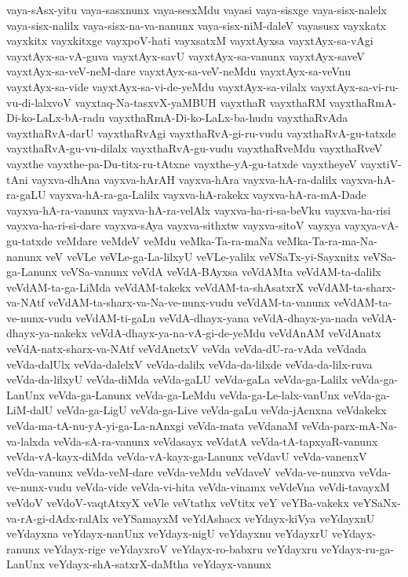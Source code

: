 {vaya-sAsx-yitu
vaya-sasxnunx
vaya-sesxMdu
vayasi
vaya-sisxge
vaya-sisx-nalelx
vaya-sisx-nalilx
vaya-sisx-na-va-nanunx
vaya-sisx-niM-daleV
vayasusx
vayxkatx
vayxkitx
vayxkitxge
vayxpoV-hati
vayxsatxM
vayxtAyxsa
vayxtAyx-sa-vAgi
vayxtAyx-sa-vA-guva
vayxtAyx-savU
vayxtAyx-sa-vanunx
vayxtAyx-saveV
vayxtAyx-sa-veV-neM-dare
vayxtAyx-sa-veV-neMdu
vayxtAyx-sa-veVnu
vayxtAyx-sa-vide
vayxtAyx-sa-vi-de-yeMdu
vayxtAyx-sa-vilalx
vayxtAyx-sa-vi-ru-vu-di-lalxvoV
vayxtaq-Na-tasxvX-yaMBUH
vayxthaR
vayxthaRM
vayxthaRmA-Di-ko-LaLx-bA-radu
vayxthaRmA-Di-ko-LaLx-ba-hudu
vayxthaRvAda
vayxthaRvA-darU
vayxthaRvAgi
vayxthaRvA-gi-ru-vudu
vayxthaRvA-gu-tatxde
vayxthaRvA-gu-vu-dilalx
vayxthaRvA-gu-vudu
vayxthaRveMdu
vayxthaRveV
vayxthe
vayxthe-pa-Du-titx-ru-tAtxne
vayxthe-yA-gu-tatxde
vayxtheyeV
vayxtiV-tAni
vayxva-dhAna
vayxva-hArAH
vayxva-hAra
vayxva-hA-ra-dalilx
vayxva-hA-ra-gaLU
vayxva-hA-ra-ga-Lalilx
vayxva-hA-rakekx
vayxva-hA-ra-mA-Dade
vayxva-hA-ra-vanunx
vayxva-hA-ra-velAlx
vayxva-ha-ri-sa-beVku
vayxva-ha-risi
vayxva-ha-ri-si-dare
vayxva-sAya
vayxva-sithxtw
vayxva-sitoV
vayxya
vayxya-vA-gu-tatxde
veMdare
veMdeV
veMdu
veMka-Ta-ra-maNa
veMka-Ta-ra-ma-Na-nanunx
veV
veVLe
veVLe-ga-La-lilxyU
veVLe-yalilx
veVSaTx-yi-Sayxnitx
veVSa-ga-Lanunx
veVSa-vanunx
veVdA
veVdA-BAyxsa
veVdAMta
veVdAM-ta-dalilx
veVdAM-ta-ga-LiMda
veVdAM-takekx
veVdAM-ta-shAsatxrX
veVdAM-ta-sharx-va-NAtf
veVdAM-ta-sharx-va-Na-ve-nunx-vudu
veVdAM-ta-vanunx
veVdAM-ta-ve-nunx-vudu
veVdAM-ti-gaLu
veVdA-dhayx-yana
veVdA-dhayx-ya-nada
veVdA-dhayx-ya-nakekx
veVdA-dhayx-ya-na-vA-gi-de-yeMdu
veVdAnAM
veVdAnatx
veVdA-natx-sharx-va-NAtf
veVdAnetxV
veVda
veVda-dU-ra-vAda
veVdada
veVda-dalUlx
veVda-dalelxV
veVda-dalilx
veVda-da-lilxde
veVda-da-lilx-ruva
veVda-da-lilxyU
veVda-diMda
veVda-gaLU
veVda-gaLa
veVda-ga-Lalilx
veVda-ga-LanUnx
veVda-ga-Lanunx
veVda-ga-LeMdu
veVda-ga-Le-lalx-vanUnx
veVda-ga-LiM-dalU
veVda-ga-LigU
veVda-ga-Live
veVda-gaLu
veVda-jAcnxna
veVdakekx
veVda-ma-tA-nu-yA-yi-ga-La-nAnxgi
veVda-mata
veVdanaM
veVda-parx-mA-Na-va-lalxda
veVda-sA-ra-vanunx
veVdasayx
veVdatA
veVda-tA-tapxyaR-vanunx
veVda-vA-kayx-diMda
veVda-vA-kayx-ga-Lanunx
veVdavU
veVda-vanenxV
veVda-vanunx
veVda-veM-dare
veVda-veMdu
veVdaveV
veVda-ve-nunxva
veVda-ve-nunx-vudu
veVda-vide
veVda-vi-hita
veVda-vinamx
veVdeVna
veVdi-tavayxM
veVdoV
veVdoV-vaqtAtxyX
veVle
veVtathx
veVtitx
veY
veYBa-vakekx
veYSaNx-va-rA-gi-dAdx-ralAlx
veYSamayxM
veYdAshacx
veYdayx-kiVya
veYdayxnU
veYdayxna
veYdayx-nanUnx
veYdayx-nigU
veYdayxnu
veYdayxrU
veYdayx-ranunx
veYdayx-rige
veYdayxroV
veYdayx-ro-babxru
veYdayxru
veYdayx-ru-ga-LanUnx
veYdayx-shA-satxrX-daMtha
veYdayx-vanunx
}

